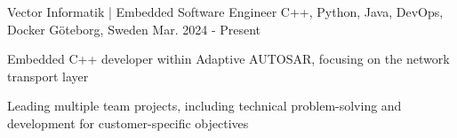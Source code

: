 

\begin{cventries}

  \cventry
    {Vector Informatik | Embedded Software Engineer} %
    {C++, Python, Java, DevOps, Docker} %
    {Göteborg, Sweden} %
    {Mar. 2024 - Present} %
    {
      \begin{cvitems} %
        \item {Embedded C++ developer within Adaptive AUTOSAR, focusing on the network transport layer}
        \item {Leading multiple team projects, including technical problem-solving and development for customer-specific objectives}
      \end{cvitems}
    }

\end{cventries}